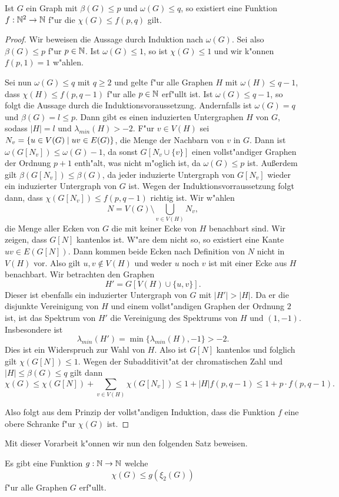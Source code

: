 \begin{lemma}
  Ist $G$ ein Graph mit $\beta(G) \leq p$ und $\omega(G) \leq q$, so existiert eine Funktion $f:{\mathbb{N}} ^{2} \to {\mathbb{N}}$ f"ur die $\chi(G) \leq f(p,q) $ gilt. 
  \label{lem:funktionxilemma}
\end{lemma}
\begin{proof}
  Wir beweisen die Aussage durch Induktion nach $\omega(G)$. Sei also $\beta(G) \leq p$ f"ur $p\in {\mathbb{N}}$. Ist $\omega(G) \leq 1$, so ist $\chi(G) \leq 1$ und wir k"onnen $f(p,1) = 1$ w"ahlen.

  Sei nun $\omega(G) \leq q$ mit $q \geq 2$ und gelte f"ur alle Graphen $H$ mit $\omega(H) \leq q-1$, dass $\chi(H) \leq f(p,q-1)$ f"ur alle $p \in {\mathbb{N}}$ erf"ullt ist.
  Ist $\omega(G) \leq q-1$, so folgt die Aussage durch die Induktionsvoraussetzung. Andernfalls ist $\omega(G) = q$ und $\beta(G) = l \leq p$. Dann gibt es einen induzierten Untergraphen $H$ von $G$, sodass $|H|=l$ und $\lambda_{min}(H)> -2$. F"ur $v\in V(H)$ sei $N_v = \{u\in V(G) \;|\; uv\in E(G) \}$, die Menge der Nachbarn von
  $v$ in $G$. Dann ist $\omega(G[N_v]) \leq \omega(G) -1 $, da sonst $G[N_v\cup \{v\}]$ einen vollst"andiger Graphen der Ordnung $p+1$ enth"alt, was nicht m"oglich ist, da $\omega(G) \leq p$ ist. Au{\ss}erdem gilt $\beta(G[N_v]) \leq \beta(G)$, da jeder induzierte Untergraph von $G[N_v]$ wieder ein induzierter Untergraph von $G$ ist. Wegen der Induktionsvorraussetzung folgt dann, dass $\chi(G[N_v]) \leq f(p,q-1)$ richtig ist. 
  Wir w"ahlen $$N = V(G) \setminus \bigcup\limits_{v\in V(H)} N_v,$$ die Menge aller Ecken von $G$ die mit keiner Ecke von $H$ benachbart sind. Wir zeigen, dass $G[N]$ kantenlos ist. W"are dem nicht so, so existiert eine Kante $uv\in E(G[N])$. 
  Dann kommen beide Ecken nach Definition von $N$ nicht in $V(H)$ vor. 
  Also gilt $u,v\notin V(H)$ und weder $u$ noch $v$ ist mit einer Ecke aus $H$ benachbart. Wir betrachten den Graphen $$H' = G[V(H) \cup \{u,v\}].$$ Dieser ist ebenfalls ein induzierter Untergraph von $G$ mit $|H'| > |H|$. Da er die disjunkte Vereinigung von $H$ und einem vollst"andigen Graphen der Ordnung $2$ ist, ist das Spektrum von $H'$ die Vereinigung des Spektrums von $H$ und $(1,-1)$. Insbesondere ist $$\lambda_{min}(H') = \min \{\lambda_{min}(H), -1\} > -2.$$ 
  Dies ist ein Widerspruch zur Wahl von $H$. Also ist $G[N]$ kantenlos und folglich gilt $\chi(G[N]) \leq 1$. 
  Wegen der Subadditivit"at der chromatischen Zahl und $|H| \leq \beta(G) \leq q$ gilt dann $$\chi(G) \leq \chi(G[N]) + \sum\limits_{v\in V(H)}\chi(G[N_v]) \leq 1 + |H|f(p,q-1)  \leq 1+p\cdot f(p,q-1).$$

  Also folgt aus dem Prinzip der vollst"andigen Induktion, dass die Funktion $f$ eine obere Schranke f"ur $\chi(G)$ ist.
\end{proof}
Mit dieser Vorarbeit k"onnen wir nun den folgenden Satz beweisen.
\begin{theorem}
  Es gibt eine Funktion $g:{\mathbb{N}} \to {\mathbb{N}}$ welche $$\chi(G) \leq g(\xi_{2}(G))$$ f"ur alle Graphen $G$ erf"ullt. 
  \label{thm:funktionxi}
\end{theorem}

